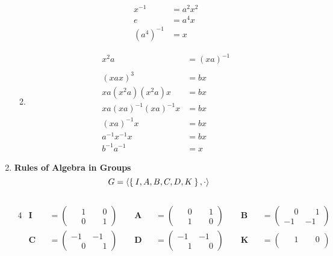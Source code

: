 \begin{enumerate}[label={\Alph*.},font={\bfseries}]
\begin{enumerate}[label={\arabic*},font={\bfseries}]
\begin{align*}
      x^{-1} &= a^2x^2 \\
      e &= a^4x \\
      \left(a^4\right)^{-1} &= x
    \end{align*}
  \item
    \begin{align*}
      x^2a &= (xa)^{-1} \\
      \\
      (xax)^3 &= bx \\
      xa(x^2a)(x^2a)x &= bx \\
      xa(xa)^{-1}(xa)^{-1}x &= bx \\
      (xa)^{-1}x &= bx \\
      a^{-1}x^{-1}x &= bx \\
      b^{-1}a^{-1} &= x
    \end{align*}
  \end{enumerate}
\item {\bf Rules of Algebra in Groups} \\
  $$G = \langle\Set{I,A,B,C,D,K}, \cdot\rangle$$ \\
  \begin{alignat*}{4}
    & \mathbf{I} &&=
    \begin{pmatrix}
      \phantom{-}1 & \phantom{-}0 \\
      \phantom{-}0 & \phantom{-}1
    \end{pmatrix}
    \qquad
    \mathbf{A} &&=
    \begin{pmatrix}
      \phantom{-}0 & \phantom{-}1 \\
      \phantom{-}1 & \phantom{-}0
    \end{pmatrix}
    \qquad
    \mathbf{B} &&=
    \begin{pmatrix}
      \phantom{-}0 & \phantom{-}1 \\
      -1 & -1
    \end{pmatrix} \\
    & \mathbf{C} &&=
    \begin{pmatrix}
      -1 & -1 \\
      \phantom{-}0 & \phantom{-}1
    \end{pmatrix}
    \qquad
    \mathbf{D} &&=
    \begin{pmatrix}
      -1 & -1 \\
      \phantom{-}1 & \phantom{-}0
    \end{pmatrix}
    \qquad
    \mathbf{K} &&=
    \begin{pmatrix}
      \phantom{-}1 & \phantom{-}0 \\

\end{pmatrix}
\end{alignat*}
\end{enumerate}
